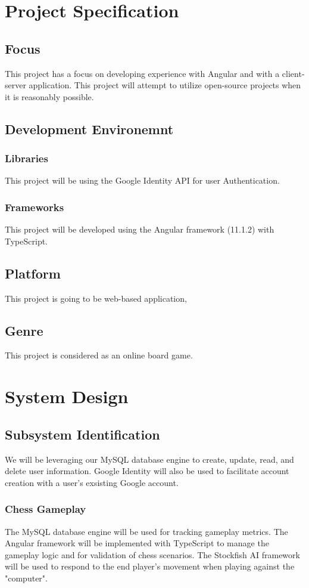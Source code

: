 \documentclass[11pt]{article}
\begin{document}
\section{Project Specification}
\label{sec:orgdc9a0f1}
\subsection{Focus}
\label{sec:org124f23c}
This project has a focus on developing experience with Angular and
with a client-server application. This project will attempt to utilize
open-source projects when it is reasonably possible.

\subsection{Development Environemnt}
\label{sec:org14fe693}
\subsubsection{Libraries}
\label{sec:org491e2a5}
This project will be using the Google Identity API for user Authentication.
\subsubsection{Frameworks}
\label{sec:org3b4b3f8}
This project will be developed using the Angular framework (11.1.2)
with TypeScript.
\subsection{Platform}
\label{sec:orgc902dfe}
This project is going to be web-based application,
\subsection{Genre}
\label{sec:org7f1e008}
This project is considered as an online board game.
\section{System Design}
\label{sec:orgb8dd84d}
\subsection{Subsystem Identification}
\label{sec:orga6fef5e}
We will be leveraging our MySQL database engine to create, update,
read, and delete user information.
Google Identity will also be used to facilitate account creation
with a user's exsisting Google account.
\subsubsection{Chess Gameplay}
\label{sec:org2e0ba70}
The MySQL database engine will be used for tracking gameplay
metrics.
The Angular framework will be implemented with TypeScript to
manage the gameplay logic and for validation of chess scenarios.
The Stockfish AI framework will be used to respond to the end
player's movement when playing against the "computer".
\end{document}
